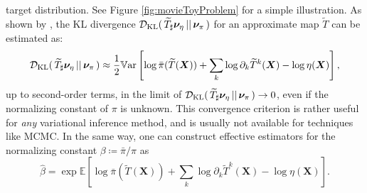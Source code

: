 \documentclass[twoside,11pt]{article}
\newcommand{\Ex}{\mathbb{E}}                                                   %
\newcommand{\Var}[1]{\underset{#1}{\mathbb{V}\mathrm{ar}}}   %
\newcommand{\push}{_\sharp}                                      %
\newcommand{\genm}{\boldsymbol{\nu} }   %
\newcommand{\ra}{\rightarrow}
\newcommand{\Xb}{\boldsymbol{X}}
\newcommand{\Dkl}{\mathcal{D}_{\rm KL}}         %
\begin{document}
target distribution. See Figure \ref{fig:movieToyProblem} for a
%
simple illustration.
%
As shown by \citet{el2012bayesian}, the KL divergence
$\Dkl(\,\widetilde{T}\push \genm_{\eta} \,\vert\vert \, \genm_{\pi} \, )$
for an approximate map $\widetilde{T}$ can be estimated as:
\begin{equation} \label{eq:var_diag}
  \Dkl(\,\widetilde{T}\push \genm_{\eta} \,\vert\vert \, \genm_{\pi} \, ) \approx
  \frac{1}{2} \Var \,\left[ \log \bar{\pi}(\widetilde{T}(\Xb)) + 
      \sum_k \log \partial_k \widetilde{T}^k(\Xb)
      - \log \eta(\Xb)   \right],
\end{equation}
up to second-order terms, in the limit of 
$\Dkl(\,\widetilde{T}\push \genm_{\eta} \,\vert\vert \, \genm_{\pi} \, ) \ra 0$, even
if the normalizing constant of $\pi$ is unknown.
This convergence criterion is rather useful for {\it any} variational inference
method, and is usually not available for techniques
like MCMC. %
%
%
%
%
%
%
%
%
In the same way, 
%
one can %
construct effective 
%
%
%
estimators for the normalizing constant
$\beta \coloneqq \bar{\pi} / \pi$ as
\begin{equation} \label{eq:normConst}
  \hat{\beta} = \exp \Ex\left[\log \bar{\pi}(\widetilde{T}(\Xb)) + 
      \sum_k \log \partial_k \widetilde{T}^k(\Xb) - \log\eta(\Xb)\right].
\end{equation}
\end{document}

